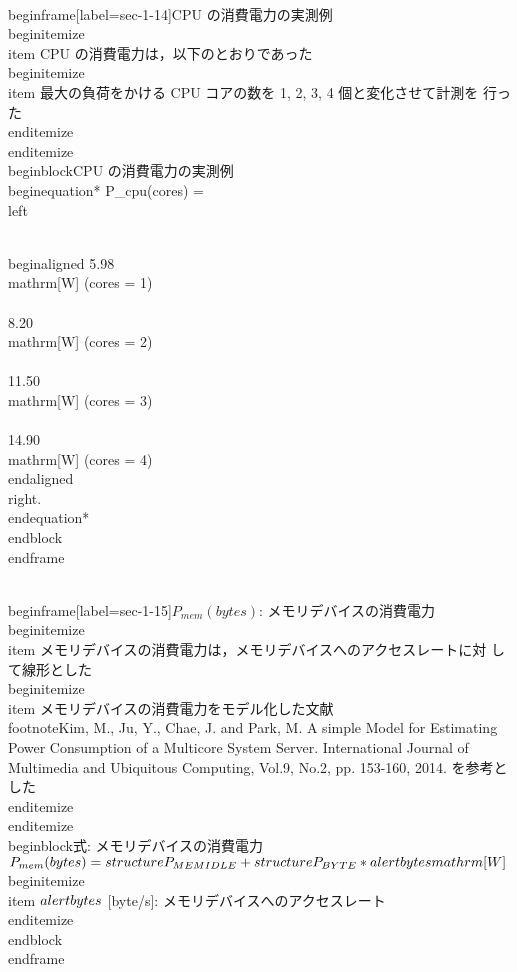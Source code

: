 {{\\begin{frame}[label=sec-1-14]{CPU の消費電力の実測例}
\\begin{itemize}
\\item CPU の消費電力は，以下のとおりであった
\\begin{itemize}
\\item 最大の負荷をかける CPU コアの数を 1, 2, 3, 4 個と変化させて計測を
行った
\\end{itemize}
\\end{itemize}
\\begin{block}{CPU の消費電力の実測例}%
\\begin{equation*}
P_{cpu}(cores) = 
     \\left\\{
       \\begin{aligned}
         5.98  \\mathrm{[W]} (cores = 1) \\\\
         8.20  \\mathrm{[W]} (cores = 2) \\\\
         11.50 \\mathrm{[W]} (cores = 3) \\\\
         14.90 \\mathrm{[W]} (cores = 4)
       \\end{aligned}
     \\right.
\\end{equation*}
\\end{block}
\\end{frame}

\\begin{frame}[label=sec-1-15]{$P_{mem}(bytes)$: メモリデバイスの消費電力}
\\begin{itemize}
\\item メモリデバイスの消費電力は，メモリデバイスへのアクセスレートに対
して線形とした
\\begin{itemize}
\\item メモリデバイスの消費電力をモデル化した文献 \\footnote{Kim, M., Ju, Y., Chae, J. and Park, M. A simple Model for
Estimating Power Consumption of a Multicore System
Server. International Journal of Multimedia and Ubiquitous Computing,
Vol.9, No.2, pp. 153-160, 2014.} を参考とした
\\end{itemize}
\\end{itemize}
\\begin{block}{式: メモリデバイスの消費電力}%
$P_{mem}(bytes) = \\structure{P_{MEMIDLE}} + \\structure{P_{BYTE}} * \\alert{bytes} \\mathrm{[W]}$
\\begin{itemize}
\\item $\\alert{bytes}$ [byte/s]: メモリデバイスへのアクセスレート
\\end{itemize}
\\end{block}
\\end{frame}

}}}
